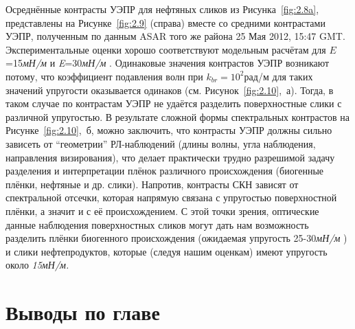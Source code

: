 Осреднённые контрасты УЭПР для нефтяных сликов из Рисунка~\ref{fig:2.8a}, представлены на Рисунке~\ref{fig:2.9} (справа) вместе со средними контрастами УЭПР, полученным по данным ASAR того же района 25 Мая 2012, 15:47 GMT. Экспериментальные оценки хорошо соответствуют модельным расчётам для $E$=15\textit{мН/м }и \textit{E}=30\textit{мН/м }. Одинаковые значения контрастов УЭПР возникают потому, что коэффициент подавления волн при $k_{br} =10^{2} $рад/м для таких значений упругости оказывается одинаков (см. Рисунок~\ref{fig:2.10},~а). Тогда, в таком случае по контрастам УЭПР не удаётся разделить поверхностные слики с различной упругостью. В результате сложной формы спектральных контрастов на Рисунке~\ref{fig:2.10},~б, можно заключить, что контрасты УЭПР должны сильно зависеть от ``геометрии'' РЛ-наблюдений (длины волны, угла наблюдения, направления визирования), что делает практически трудно разрешимой задачу разделения и интерпретации плёнок различного происхождения (биогенные плёнки, нефтяные и др. слики). Напротив, контрасты СКН зависят от спектральной отсечки, которая напрямую связана с упругостью поверхностной плёнки, а значит и с её происхождением. С этой точки зрения, оптические данные наблюдения поверхностных сликов могут дать нам возможность разделить плёнки биогенного происхождения (ожидаемая упругость 25-30\textit{мН/м }) и слики нефтепродуктов, которые (следуя нашим оценкам) имеют упругость около \textit{15мН/м.} 




\newpage



\section{Выводы по главе}




